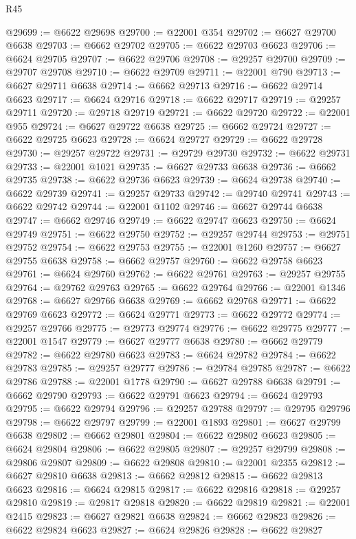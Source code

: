 \begin{lexlean}{R45}
\begin{coremodule}
{@29699 := @6622 @29698
@29700 := @22001 @354
@29702 := @6627 @29700 @6638
@29703 := @6662 @29702
@29705 := @6622 @29703 @6623
@29706 := @6624 @29705
@29707 := @6622 @29706
@29708 := @29257 @29700
@29709 := @29707 @29708
@29710 := @6622 @29709
@29711 := @22001 @790
@29713 := @6627 @29711 @6638
@29714 := @6662 @29713
@29716 := @6622 @29714 @6623
@29717 := @6624 @29716
@29718 := @6622 @29717
@29719 := @29257 @29711
@29720 := @29718 @29719
@29721 := @6622 @29720
@29722 := @22001 @955
@29724 := @6627 @29722 @6638
@29725 := @6662 @29724
@29727 := @6622 @29725 @6623
@29728 := @6624 @29727
@29729 := @6622 @29728
@29730 := @29257 @29722
@29731 := @29729 @29730
@29732 := @6622 @29731
@29733 := @22001 @1021
@29735 := @6627 @29733 @6638
@29736 := @6662 @29735
@29738 := @6622 @29736 @6623
@29739 := @6624 @29738
@29740 := @6622 @29739
@29741 := @29257 @29733
@29742 := @29740 @29741
@29743 := @6622 @29742
@29744 := @22001 @1102
@29746 := @6627 @29744 @6638
@29747 := @6662 @29746
@29749 := @6622 @29747 @6623
@29750 := @6624 @29749
@29751 := @6622 @29750
@29752 := @29257 @29744
@29753 := @29751 @29752
@29754 := @6622 @29753
@29755 := @22001 @1260
@29757 := @6627 @29755 @6638
@29758 := @6662 @29757
@29760 := @6622 @29758 @6623
@29761 := @6624 @29760
@29762 := @6622 @29761
@29763 := @29257 @29755
@29764 := @29762 @29763
@29765 := @6622 @29764
@29766 := @22001 @1346
@29768 := @6627 @29766 @6638
@29769 := @6662 @29768
@29771 := @6622 @29769 @6623
@29772 := @6624 @29771
@29773 := @6622 @29772
@29774 := @29257 @29766
@29775 := @29773 @29774
@29776 := @6622 @29775
@29777 := @22001 @1547
@29779 := @6627 @29777 @6638
@29780 := @6662 @29779
@29782 := @6622 @29780 @6623
@29783 := @6624 @29782
@29784 := @6622 @29783
@29785 := @29257 @29777
@29786 := @29784 @29785
@29787 := @6622 @29786
@29788 := @22001 @1778
@29790 := @6627 @29788 @6638
@29791 := @6662 @29790
@29793 := @6622 @29791 @6623
@29794 := @6624 @29793
@29795 := @6622 @29794
@29796 := @29257 @29788
@29797 := @29795 @29796
@29798 := @6622 @29797
@29799 := @22001 @1893
@29801 := @6627 @29799 @6638
@29802 := @6662 @29801
@29804 := @6622 @29802 @6623
@29805 := @6624 @29804
@29806 := @6622 @29805
@29807 := @29257 @29799
@29808 := @29806 @29807
@29809 := @6622 @29808
@29810 := @22001 @2355
@29812 := @6627 @29810 @6638
@29813 := @6662 @29812
@29815 := @6622 @29813 @6623
@29816 := @6624 @29815
@29817 := @6622 @29816
@29818 := @29257 @29810
@29819 := @29817 @29818
@29820 := @6622 @29819
@29821 := @22001 @2415
@29823 := @6627 @29821 @6638
@29824 := @6662 @29823
@29826 := @6622 @29824 @6623
@29827 := @6624 @29826
@29828 := @6622 @29827
}
\end{coremodule}
\end{lexlean}

